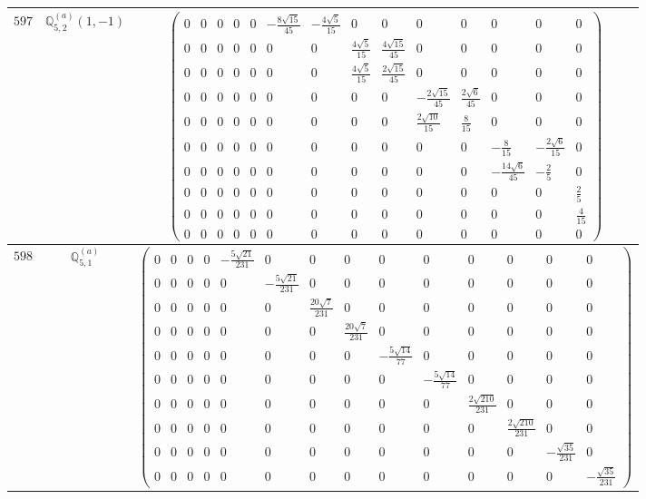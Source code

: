 \documentclass[fleqn,8pt,landscape]{jsarticle}
\begin{document}
\begin{center}
\begin{longtable}{ccc}
$ 597 $ & $ \mathbb{Q}_{5,2}^{(a)}(1,-1) $ & $ \begin{pmatrix} 0 & 0 & 0 & 0 & 0 & - \frac{8 \sqrt{15}}{45} & - \frac{4 \sqrt{5}}{15} & 0 & 0 & 0 & 0 & 0 & 0 & 0 \\ 0 & 0 & 0 & 0 & 0 & 0 & 0 & \frac{4 \sqrt{5}}{15} & \frac{4 \sqrt{15}}{45} & 0 & 0 & 0 & 0 & 0 \\ 0 & 0 & 0 & 0 & 0 & 0 & 0 & \frac{4 \sqrt{5}}{15} & \frac{2 \sqrt{15}}{45} & 0 & 0 & 0 & 0 & 0 \\ 0 & 0 & 0 & 0 & 0 & 0 & 0 & 0 & 0 & - \frac{2 \sqrt{15}}{45} & \frac{2 \sqrt{6}}{45} & 0 & 0 & 0 \\ 0 & 0 & 0 & 0 & 0 & 0 & 0 & 0 & 0 & \frac{2 \sqrt{10}}{15} & \frac{8}{15} & 0 & 0 & 0 \\ 0 & 0 & 0 & 0 & 0 & 0 & 0 & 0 & 0 & 0 & 0 & - \frac{8}{15} & - \frac{2 \sqrt{6}}{15} & 0 \\ 0 & 0 & 0 & 0 & 0 & 0 & 0 & 0 & 0 & 0 & 0 & - \frac{14 \sqrt{6}}{45} & - \frac{2}{5} & 0 \\ 0 & 0 & 0 & 0 & 0 & 0 & 0 & 0 & 0 & 0 & 0 & 0 & 0 & \frac{2}{5} \\ 0 & 0 & 0 & 0 & 0 & 0 & 0 & 0 & 0 & 0 & 0 & 0 & 0 & \frac{4}{15} \\ 0 & 0 & 0 & 0 & 0 & 0 & 0 & 0 & 0 & 0 & 0 & 0 & 0 & 0 \end{pmatrix} $ \\ \hline
$ 598 $ & $ \mathbb{Q}_{5,1}^{(a)} $ & $ \begin{pmatrix} 0 & 0 & 0 & 0 & - \frac{5 \sqrt{21}}{231} & 0 & 0 & 0 & 0 & 0 & 0 & 0 & 0 & 0 \\ 0 & 0 & 0 & 0 & 0 & - \frac{5 \sqrt{21}}{231} & 0 & 0 & 0 & 0 & 0 & 0 & 0 & 0 \\ 0 & 0 & 0 & 0 & 0 & 0 & \frac{20 \sqrt{7}}{231} & 0 & 0 & 0 & 0 & 0 & 0 & 0 \\ 0 & 0 & 0 & 0 & 0 & 0 & 0 & \frac{20 \sqrt{7}}{231} & 0 & 0 & 0 & 0 & 0 & 0 \\ 0 & 0 & 0 & 0 & 0 & 0 & 0 & 0 & - \frac{5 \sqrt{14}}{77} & 0 & 0 & 0 & 0 & 0 \\ 0 & 0 & 0 & 0 & 0 & 0 & 0 & 0 & 0 & - \frac{5 \sqrt{14}}{77} & 0 & 0 & 0 & 0 \\ 0 & 0 & 0 & 0 & 0 & 0 & 0 & 0 & 0 & 0 & \frac{2 \sqrt{210}}{231} & 0 & 0 & 0 \\ 0 & 0 & 0 & 0 & 0 & 0 & 0 & 0 & 0 & 0 & 0 & \frac{2 \sqrt{210}}{231} & 0 & 0 \\ 0 & 0 & 0 & 0 & 0 & 0 & 0 & 0 & 0 & 0 & 0 & 0 & - \frac{\sqrt{35}}{231} & 0 \\ 0 & 0 & 0 & 0 & 0 & 0 & 0 & 0 & 0 & 0 & 0 & 0 & 0 & - \frac{\sqrt{35}}{231} \end{pmatrix} $ \\ \hline

\end{longtable}
\end{center}
\end{document}
